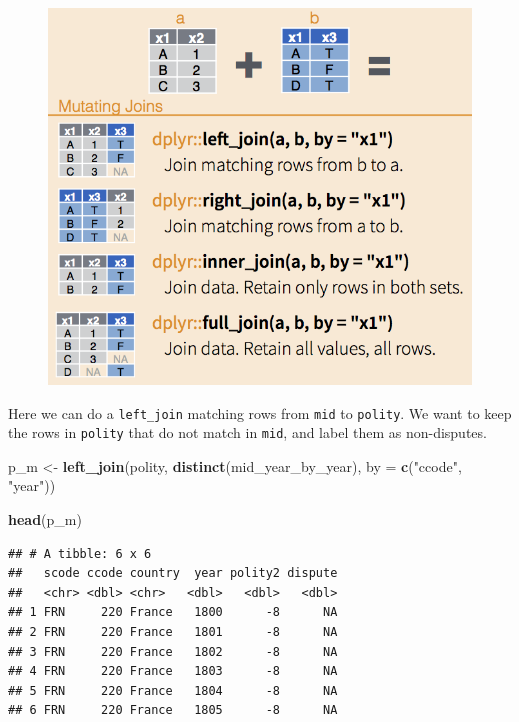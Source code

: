 \documentclass[]{book}
\newenvironment{Shaded}{\begin{snugshade}}{\end{snugshade}}
\newcommand{\KeywordTok}[1]{\textcolor[rgb]{0.13,0.29,0.53}{\textbf{#1}}}
\newcommand{\DataTypeTok}[1]{\textcolor[rgb]{0.13,0.29,0.53}{#1}}
\newcommand{\StringTok}[1]{\textcolor[rgb]{0.31,0.60,0.02}{#1}}
\newcommand{\NormalTok}[1]{#1}
\theoremstyle{definition}
\theoremstyle{definition}
\theoremstyle{definition}
\theoremstyle{remark}
\begin{document}
\begin{figure}
\centering
\includegraphics{images/dplyr-joins.png}
\caption{}
\end{figure}

Here we can do a \texttt{left\_join} matching rows from \texttt{mid} to
\texttt{polity}. We want to keep the rows in \texttt{polity} that do not
match in \texttt{mid}, and label them as non-disputes.

\begin{Shaded}
\begin{Highlighting}[]
\NormalTok{p_m <-}\StringTok{ }\KeywordTok{left_join}\NormalTok{(polity,}
                 \KeywordTok{distinct}\NormalTok{(mid_year_by_year),}
                 \DataTypeTok{by =} \KeywordTok{c}\NormalTok{(}\StringTok{"ccode"}\NormalTok{, }\StringTok{"year"}\NormalTok{))}

\KeywordTok{head}\NormalTok{(p_m)}
\end{Highlighting}
\end{Shaded}

\begin{verbatim}
## # A tibble: 6 x 6
##   scode ccode country  year polity2 dispute
##   <chr> <dbl> <chr>   <dbl>   <dbl>   <dbl>
## 1 FRN     220 France   1800      -8      NA
## 2 FRN     220 France   1801      -8      NA
## 3 FRN     220 France   1802      -8      NA
## 4 FRN     220 France   1803      -8      NA
## 5 FRN     220 France   1804      -8      NA
## 6 FRN     220 France   1805      -8      NA
\end{verbatim}
\end{document}

